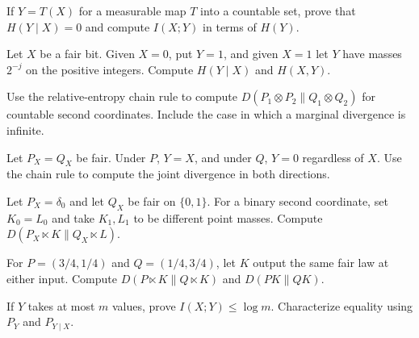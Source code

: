 \documentclass[11pt,oneside]{book}
\theoremstyle{definition}
\theoremstyle{remark}
\begin{document}
\begin{practiceexercise}
\label{pex:conditional-entropy-deterministic}
If $Y=T(X)$ for a measurable map $T$ into a countable set, prove
that $H(Y\mid X)=0$ and compute $I(X;Y)$ in terms of $H(Y)$.
\end{practiceexercise}

\begin{practiceexercise}
\label{pex:conditional-entropy-count}
Let $X$ be a fair bit. Given $X=0$, put $Y=1$, and given $X=1$
let $Y$ have masses $2^{-j}$ on the positive integers.
Compute $H(Y\mid X)$ and $H(X,Y)$.
\end{practiceexercise}

\begin{practiceexercise}
\label{pex:relative-entropy-products}
Use the relative-entropy chain rule to compute
$D(P_1\otimes P_2\|Q_1\otimes Q_2)$ for countable second
coordinates. Include the case in which a marginal divergence
is infinite.
\end{practiceexercise}

\begin{practiceexercise}
\label{pex:relative-entropy-singular-row}
Let $P_X=Q_X$ be fair. Under $P$, $Y=X$, and under $Q$, $Y=0$
regardless of $X$. Use the chain rule to compute the joint
divergence in both directions.
\end{practiceexercise}

\begin{practiceexercise}
\label{pex:relative-entropy-absent-row}
Let $P_X=\delta_0$ and let $Q_X$ be fair on $\{0,1\}$. For a binary
second coordinate, set $K_0=L_0$ and take $K_1,L_1$ to be
different point masses. Compute $D(P_X\ltimes K\|Q_X\ltimes L)$.
\end{practiceexercise}

\begin{practiceexercise}
\label{pex:relative-entropy-common-kernel}
For $P=(3/4,1/4)$ and $Q=(1/4,3/4)$, let $K$ output the same
fair law at either input. Compute $D(P\ltimes K\|Q\ltimes K)$
and $D(PK\|QK)$.
\end{practiceexercise}

\begin{practiceexercise}
\label{pex:mutual-information-alphabet-bound}
If $Y$ takes at most $m$ values, prove $I(X;Y)\leq\log m$.
Characterize equality using $P_Y$ and $P_{Y\mid X}$.
\end{practiceexercise}
\end{document}
